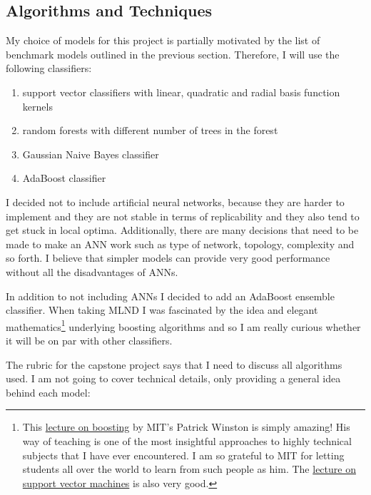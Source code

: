 \documentclass[10pt, a4paper]{article}
\begin{document}
\subsection{Algorithms and Techniques}

My choice of models for this project is partially motivated by the list of benchmark models outlined in the previous section. Therefore, I will use the following classifiers:

\begin{enumerate}
	\item support vector classifiers with linear, quadratic and radial basis function kernels
	\item random forests with different number of trees in the forest
	\item Gaussian Naive Bayes classifier
	\item AdaBoost classifier
\end{enumerate}

I decided not to include artificial neural networks, because they are harder to implement and they are not stable in terms of replicability and they also tend to get stuck in local optima. Additionally, there are many decisions that need to be made to make an ANN work such as type of network, topology, complexity and so forth. I believe that simpler models can provide very good performance without all the disadvantages of ANNs.

In addition to not including ANNs I decided to add an AdaBoost ensemble classifier. When taking MLND I was fascinated by the idea and elegant mathematics\footnote{\scriptsize This \href{https://youtu.be/UHBmv7qCey4}{lecture on boosting} by MIT's Patrick Winston is simply amazing! His way of teaching is one of the most insightful approaches to highly technical subjects that I have ever encountered. I am so grateful to MIT for letting students all over the world to learn from such people as him. The \href{https://youtu.be/_PwhiWxHK8o}{lecture on support vector machines} is also very good.} underlying boosting algorithms and so I am really curious whether it will be on par with other classifiers.

The rubric for the capstone project says that I need to discuss all algorithms used. I am not going to cover technical details, only providing a general idea behind each model:
\end{document}
